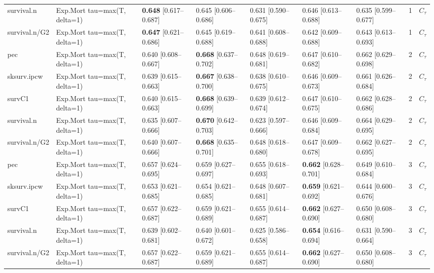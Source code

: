 \begin{tabular}{lllllllrl}
survival.n & Exp.Mort tau=max(T, delta=1) & \textbf{0.648} [0.617–0.687] & 0.645 [0.606–0.686] & 0.631 [0.590–0.675] & 0.646 [0.613–0.688] & 0.635 [0.599–0.677] & 1 & $C_{\tau}$\\
survival.n/G2 & Exp.Mort tau=max(T, delta=1) & \textbf{0.647} [0.621–0.686] & 0.645 [0.619–0.688] & 0.641 [0.608–0.688] & 0.642 [0.609–0.688] & 0.643 [0.613–0.693] & 1 & $C_{\tau}$\\
\addlinespace
pec & Exp.Mort tau=max(T, delta=1) & 0.640 [0.608–0.667] & \textbf{0.668} [0.637–0.702] & 0.648 [0.619–0.681] & 0.647 [0.610–0.682] & 0.662 [0.629–0.698] & 2 & $C_{\tau}$\\
sksurv.ipcw & Exp.Mort tau=max(T, delta=1) & 0.639 [0.615–0.663] & \textbf{0.667} [0.638–0.700] & 0.638 [0.610–0.675] & 0.646 [0.609–0.673] & 0.661 [0.626–0.684] & 2 & $C_{\tau}$\\
survC1 & Exp.Mort tau=max(T, delta=1) & 0.640 [0.615–0.663] & \textbf{0.668} [0.639–0.699] & 0.639 [0.612–0.674] & 0.647 [0.610–0.675] & 0.662 [0.628–0.686] & 2 & $C_{\tau}$\\
survival.n & Exp.Mort tau=max(T, delta=1) & 0.635 [0.607–0.666] & \textbf{0.670} [0.642–0.703] & 0.623 [0.597–0.666] & 0.646 [0.609–0.684] & 0.664 [0.629–0.695] & 2 & $C_{\tau}$\\
survival.n/G2 & Exp.Mort tau=max(T, delta=1) & 0.640 [0.607–0.666] & \textbf{0.668} [0.635–0.701] & 0.648 [0.618–0.680] & 0.647 [0.609–0.678] & 0.662 [0.627–0.695] & 2 & $C_{\tau}$\\
\addlinespace
pec & Exp.Mort tau=max(T, delta=1) & 0.657 [0.624–0.695] & 0.659 [0.627–0.697] & 0.655 [0.618–0.693] & \textbf{0.662} [0.628–0.701] & 0.649 [0.610–0.684] & 3 & $C_{\tau}$\\
sksurv.ipcw & Exp.Mort tau=max(T, delta=1) & 0.653 [0.621–0.685] & 0.654 [0.621–0.685] & 0.648 [0.607–0.681] & \textbf{0.659} [0.621–0.692] & 0.644 [0.600–0.676] & 3 & $C_{\tau}$\\
survC1 & Exp.Mort tau=max(T, delta=1) & 0.657 [0.622–0.687] & 0.659 [0.621–0.689] & 0.655 [0.614–0.687] & \textbf{0.662} [0.627–0.690] & 0.650 [0.608–0.680] & 3 & $C_{\tau}$\\
survival.n & Exp.Mort tau=max(T, delta=1) & 0.639 [0.602–0.681] & 0.640 [0.601–0.672] & 0.625 [0.586–0.658] & \textbf{0.654} [0.616–0.694] & 0.631 [0.590–0.664] & 3 & $C_{\tau}$\\
survival.n/G2 & Exp.Mort tau=max(T, delta=1) & 0.657 [0.622–0.687] & 0.659 [0.621–0.689] & 0.655 [0.614–0.687] & \textbf{0.662} [0.627–0.690] & 0.650 [0.608–0.680] & 3 & $C_{\tau}$\\

\end{tabular}
